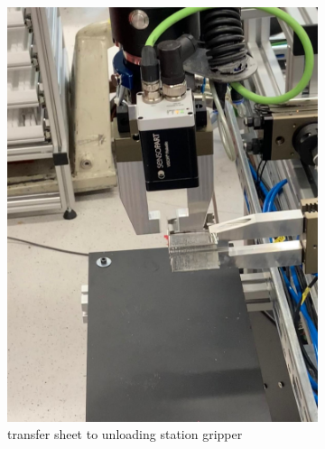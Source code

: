 \begin{figure}[h]
\begin{subfigure}[b]{0.32\textwidth}
        \includegraphics[width=\textwidth]{figures/sheet-pickup/sheet-placement02.png}
        \caption{transfer sheet to unloading station gripper}
        \label{subfig:sheet-placement02}
    \end{subfigure}\hspace{0.1cm}
    \vspace{1cm}
    \begin{subfigure}[b]{0.32\textwidth}
        \centering

\end{subfigure}
\end{figure}
